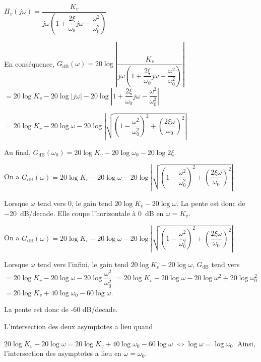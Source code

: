 \ifprof \begin{corrige}
$H_v(j\omega )=\dfrac{K_v}{j\omega\left( 1+\dfrac{2\xi}{\omega_0} j\omega - \dfrac{\omega^2}{\omega_0^2} \right)}$

En conséquence,  $
G_{\text{dB}}\left(\omega \right)=20\log\left| \dfrac{K_v}{j\omega\left( 1+\dfrac{2\xi}{\omega_0} j\omega - \dfrac{\omega^2}{\omega_0^2} \right)} \right|
$
$
=20\log K_v- 20\log  \left| j\omega\right| - 20\log  \left| 1+\dfrac{2\xi}{\omega_0} j\omega - \dfrac{\omega^2}{\omega_0^2}  \right|
$

$
=20\log K_v- 20\log  \omega - 20\log  \left| \sqrt{\left(1- \dfrac{\omega^2}{\omega_0^2} \right)^2+\left( \dfrac{2\xi\omega }{\omega_0} \right)^2} \right|
$

Au final, 
$G_{\text{dB}}\left(\omega_0 \right)=
20\log K_v- 20\log  \omega_0 - 20\log 2\xi $.
\end{corrige} \else \fi


\ifprof \begin{corrige}
On a $G_{\text{dB}}\left(\omega \right)
=20\log K_v- 20\log  \omega - 20\log  \left| \sqrt{\left(1- \dfrac{\omega^2}{\omega_0^2} \right)^2+\left( \dfrac{2\xi\omega }{\omega_0} \right)^2} \right|$. 

Lorsque $\omega$ tend vers 0, le gain tend $20\log K_v- 20\log  \omega$.
 La pente est donc de \SI{-20}{dB/decade}. Elle coupe l'horizontale à \SI{0}{dB} en $\omega=K_v$.

\end{corrige} \else \fi



\ifprof \begin{corrige}
On a $G_{\text{dB}}\left(\omega \right)
=20\log K_v- 20\log  \omega - 20\log  \left| \sqrt{\left(1- \dfrac{\omega^2}{\omega_0^2} \right)^2+\left( \dfrac{2\xi\omega }{\omega_0} \right)^2} \right|$. 

Lorsque $\omega$ tend vers l'infini, le gain tend $20\log K_v- 20\log  \omega$, 
$G_{\text{dB}}$ tend vers 
$= 20\log K_v- 20\log  \omega - 20\log  \dfrac{\omega^2}{\omega_0^2} $
$= 20\log K_v- 20\log  \omega - 20\log  \omega^2 +20\log  \omega_0^2 $
$= 20\log K_v+ 40\log  \omega_0 - 60\log  \omega $.

La pente est donc de -60 dB/decade.

L'intersection des deux asymptotes a lieu quand 

$20\log K_v- 20\log  \omega= 20\log K_v+40\log  \omega_0 - 60\log  \omega$
$\Leftrightarrow \log  \omega= \log  \omega_0 $. Ainsi, l'intersection des asymptotes a lieu en $\omega=\omega_0$. 
\end{corrige} \else \fi

